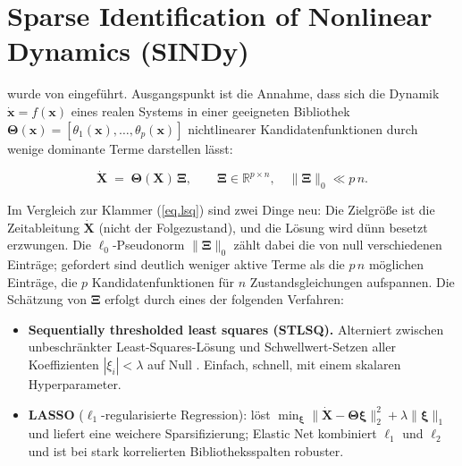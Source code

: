 \section{Sparse Identification of Nonlinear Dynamics (SINDy)}
\label{sec.sot.sindy}

\label{ssec.sot.sindy.basis}

\sindy{} wurde von \cite{bruntonDiscoveringGoverningEquations2016}
eingeführt. Ausgangspunkt ist die Annahme, dass sich die Dynamik
$\dot{\mathbf x} = f(\mathbf x)$ eines realen Systems in einer geeigneten
Bibliothek
$\boldsymbol\Theta(\mathbf x) = [\theta_1(\mathbf x),\dots,\theta_p(\mathbf x)]$
nichtlinearer Kandidatenfunktionen durch wenige dominante Terme
darstellen lässt:

\begin{equation}
  \label{eq.sindy.def}
  \dot{\mathbf X} \;=\; \boldsymbol\Theta(\mathbf X)\,\boldsymbol\Xi,
  \qquad
  \boldsymbol\Xi \in \mathbb{R}^{p \times n},\quad \|\boldsymbol\Xi\|_0 \ll p\,n.
\end{equation}

Im Vergleich zur Klammer (\ref{eq.lsq}) sind zwei Dinge neu: Die
Zielgröße ist die Zeitableitung $\dot{\mathbf X}$ (nicht der
Folgezustand), und die Lösung wird dünn besetzt erzwungen. Die
$\ell_0$-Pseudonorm $\|\boldsymbol\Xi\|_0$ zählt dabei die von null
verschiedenen Einträge; gefordert sind deutlich weniger aktive Terme
als die $p\,n$ möglichen Einträge, die $p$ Kandidatenfunktionen für
$n$ Zustandsgleichungen aufspannen. Die Schätzung
von $\boldsymbol\Xi$ erfolgt durch eines der folgenden Verfahren:

\begin{itemize}
  \item \textbf{Sequentially thresholded least squares (STLSQ).}
    Alterniert zwischen unbeschränkter Least-Squares-Lösung und
    Schwellwert-Setzen aller Koeffizienten $|\xi_i| < \lambda$ auf Null
    \cite[Algorithmus~1]{bruntonDiscoveringGoverningEquations2016}.
    Einfach, schnell, mit einem skalaren Hyperparameter.
  \item \textbf{LASSO} ($\ell_1$-regularisierte Regression): löst
    $\min_{\boldsymbol\xi} \|\dot{\mathbf X} - \boldsymbol\Theta\boldsymbol\xi\|_2^2
    + \lambda\|\boldsymbol\xi\|_1$ und liefert eine weichere
    Sparsifizierung; Elastic Net kombiniert $\ell_1$ und $\ell_2$ und ist
    bei stark korrelierten Bibliotheksspalten robuster.
\end{itemize}

